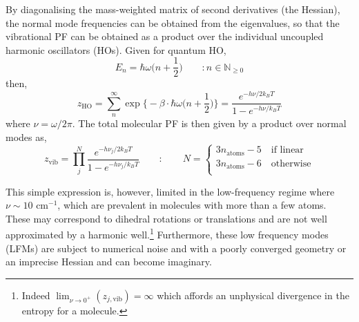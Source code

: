 \documentclass[../main.tex]{subfiles}
\begin{document}
By diagonalising the mass-weighted matrix of second derivatives (the Hessian), the normal mode frequencies can be obtained from the eigenvalues, so that the vibrational PF can be obtained as a product over the individual uncoupled harmonic oscillators (HOs). Given for quantum HO,
\begin{equation}
E_n = \hbar\omega {\Big (} n + \frac{1}{2} {\Big )} \qquad : n \in \mathbb{N}_{\ge 0}
\end{equation}
then,
\begin{equation}
	z_\text{HO} = \sum_{n}^\infty \exp {\Big \{} -{\beta}\cdot  \hbar\omega {\Big (} n + \frac{1}{2} {\Big )} {\Big \}}  = \frac{e^{-h\nu / 2 k_B T}}{1 - e^{-h\nu / k_B T} }
\end{equation}
where $\nu = \omega / 2\pi$. The total molecular PF is then given by a product over normal modes as,
\begin{equation}
z_\text{vib} = \prod_j^{N} \frac{e^{-h\nu_j / 2 k_B T}}{1 - e^{-h\nu_j / k_B T} } \qquad : \qquad  N = \begin{cases}
	3 n_\text{atoms} - 5 \quad\text{if linear} \\
	3 n_\text{atoms} - 6 \quad\text{otherwise} \\
 \end{cases}
\label{z_ho}
\end{equation}

This simple expression is, however, limited in the low-frequency regime where $\nu \sim 10 \text{ cm}^{-1}$, which are prevalent in molecules with more than a few atoms. These may correspond to dihedral rotations or translations and are not well approximated by a harmonic well.\footnote{Indeed $\lim_{\nu \rightarrow 0^+} (z_{j, \text{vib}})= \infty$ which affords an unphysical divergence in the entropy for a molecule.} Furthermore, these low frequency modes (LFMs) are subject to numerical noise and with a poorly converged geometry or an imprecise Hessian and can become imaginary.
\end{document}
